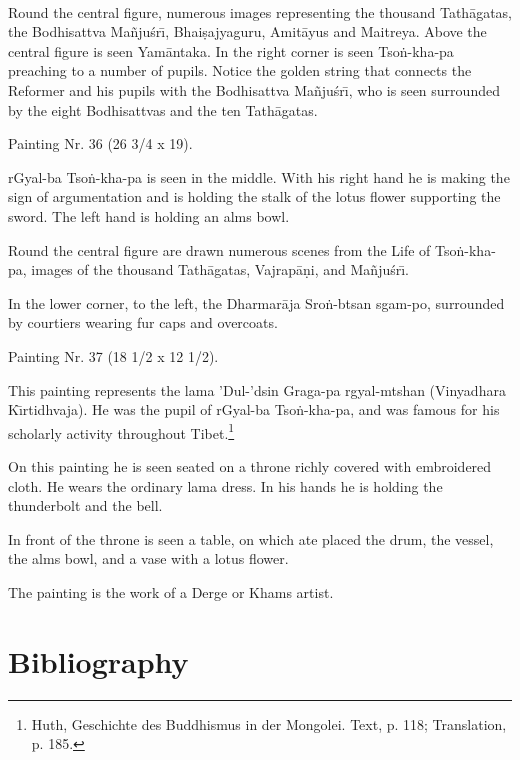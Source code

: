 \documentclass[a4paper, 12pt, oneside]{article}
\begin{document}
\paragraph{}
Round the central figure, numerous images representing the thousand Tath\={a}gatas, the Bodhisattva Ma\~{n}ju\'{s}r\={\i}, Bhai\d{s}ajyaguru, Amit\={a}yus and Maitreya. Above the central figure is seen Yam\={a}ntaka. In the right corner is seen Tso\.{n}-kha-pa preaching to a number of pupils. Notice the golden string that connects the Reformer and his pupils with the Bodhisattva Ma\~{n}ju\'{s}r\={\i}, who is seen surrounded by the eight Bodhisattvas and the ten Tath\={a}gatas.

\bigskip

Painting Nr. 36 (26 3/4 x 19).

\bigskip

rGyal-ba Tso\.{n}-kha-pa is seen in the middle. With his right hand he is making the sign of argumentation and is holding the stalk of the lotus flower supporting the sword. The left hand is holding an alms bowl.

Round the central figure are drawn numerous scenes from the Life of Tso\.{n}-kha-pa, images of the thousand Tath\={a}gatas, Vajrap\={a}\d{n}i, and Ma\~{n}ju\'{s}r\={\i}.

In the lower corner, to the left, the Dharmar\={a}ja Sro\.{n}-btsan sgam-po, surrounded by courtiers wearing fur caps and overcoats.

\bigskip

Painting Nr. 37 (18 1/2 x 12 1/2).

\bigskip

This painting represents the lama 'Dul-'dsin Graga-pa rgyal-mtshan (Vinyadhara K\={\i}rtidhvaja). He was the pupil of rGyal-ba Tso\.{n}-kha-pa, and was famous for his scholarly activity throughout Tibet.\footnote{Huth, Geschichte des Buddhismus in der Mongolei. Text, p. 118; Translation, p. 185.}

On this painting he is seen seated on a throne richly covered with embroidered cloth. He wears the ordinary lama dress. In his hands he is holding the thunderbolt and the bell.

In front of the throne is seen a table, on which ate placed the drum, the vessel, the alms bowl, and a vase with a lotus flower.

The painting is the work of a Derge or Khams artist.

\clearpage
\section*{Bibliography}
\end{document}
